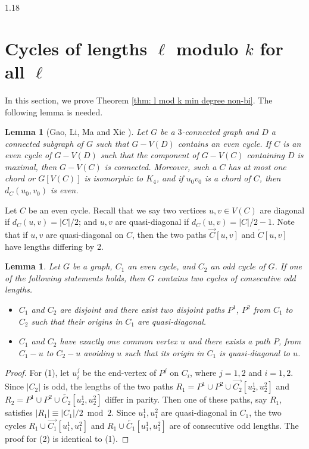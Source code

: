 \documentclass[10pt]{article}
\newtheorem{lemma}[theorem]{Lemma}
\begin{document}
\begin{spacing}{1.18}
\section{Cycles of lengths $\ell$ modulo $k$ for all $\ell$}\label{section: all ell}

In this section, we prove Theorem \ref{thm: l mod k min degree non-bi}. The following lemma is needed.


\begin{lemma}[Gao, Li, Ma and Xie \cite{GLMX}]\label{lemma: G-C is con}
    Let $G$ be a $3$-connected graph and $D$ a connected subgraph of $G$ such that $G-V(D)$ contains an even cycle. If $C$ is an even cycle of $G-V(D)$ such that the component of $G-V(C)$ containing $D$ is maximal, then $G-V(C)$ is connected. Moreover, such a $C$ has at most one chord or $G[V(C)]$ is isomorphic to $K_4$, and if $u_0v_0$ is a chord of $C$, then $d_C(u_0,v_0)$ is even.
\end{lemma}

Let $C$ be an even cycle. Recall that we say two vertices $u,v\in V(C)$ are diagonal if $d_C(u,v)=|C|/2$; and $u,v$ are quasi-diagonal if $d_C(u,v)=|C|/2-1$. Note that if $u,v$ are quasi-diagonal on $C$, then the two paths $\overrightarrow{C}[u,v]$ and $\overleftarrow{C}[u,v]$ have lengths differing by 2.

\begin{lemma}\label{lemma: TwoPathsTwoCycles}
    Let $G$ be a graph, $C_1$ an even cycle, and $C_2$ an odd cycle of $G$. If one of the following statements holds, then $G$ contains two cycles of consecutive odd lengths.
    \begin{itemize}
        \item[(1)] $C_1$ and $C_2$ are disjoint and there exist two disjoint paths $P^1$, $P^2$ from $C_1$ to $C_2$ such that their origins in $C_1$ are quasi‐diagonal.
        \item[(2)] $C_1$ and $C_2$ have exactly one common vertex $u$ and there exists a path $P$, from $C_1-u$ to $C_2-u$ avoiding $u$ such that its origin in $C_1$ is quasi‐diagonal to $u$.
    \end{itemize}
\end{lemma}

\begin{proof}
    For (1), let $u_i^j$ be the end-vertex of $P^j$ on $C_i$, where $j=1,2$ and $i=1,2$. Since $|C_2|$ is odd, the lengths of the two paths $R_1=P^1\cup P^2\cup\overrightarrow{C_2}[u_2^1,u_2^2]$ and $R_2=P^1\cup P^2\cup\overleftarrow{C_2}[u_2^1,u_2^2]$ differ in parity. Then one of these paths, say $R_1$, satisfies $|R_1|\equiv|C_1|/2\bmod 2$. Since $u_1^1,u_1^2$ are quasi‐diagonal in $C_1$, the two cycles $R_1\cup\overrightarrow{C_1}[u_1^1,u_1^2]$ and $R_1\cup\overleftarrow{C_1}[u_1^1,u_1^2]$ are of consecutive odd lengths. The proof for (2) is identical to (1).
\end{proof}


\end{spacing}
\end{document}
